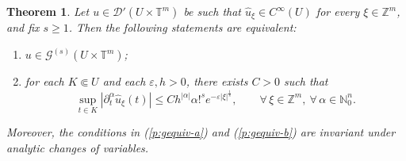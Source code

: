 \documentclass[11pt,reqno]{amsart}
\numberwithin{equation}{section}
\newtheorem{theorem}{Theorem}[section]
\begin{document}
\begin{theorem}
	Let \(u\in\mathscr{D}'(U\times\mathbb{T}^m)\) be such that \(\widehat{u}_\xi\in C^\infty(U)\) for every \(\xi\in\mathbb{Z}^m\), and fix \(s\geq 1\).
	Then the following statements are equivalent:
	\begin{enumerate}
		\item\label{p:gequiv-a} 
		\(u\in \mathscr{G}^{(s)}(U\times\mathbb{T}^m)\);
		\item\label{p:gequiv-b} for each \(K\Subset U\) and each \(\varepsilon,h>0\), there exists \(C>0\) such that
		\[
		\sup_{t\in K}|\partial_t^\alpha\widehat{u}_\xi(t)|
		\leq
		Ch^{|\alpha|}\alpha!^s e^{-\varepsilon|\xi|^{\frac{1}{s}}},
		\qquad \forall\,\xi\in\mathbb{Z}^m,\ \forall\, \alpha\in\mathbb{N}_0^n.
		\]
	\end{enumerate}
	 
	Moreover, the conditions in (\ref{p:gequiv-a}) and (\ref{p:gequiv-b}) 
	are invariant under analytic changes of variables.
\end{theorem}
\end{document}
